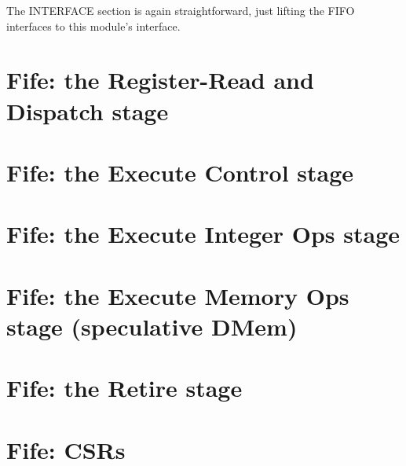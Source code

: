 The INTERFACE section is again straightforward, just lifting the FIFO
interfaces to this module's interface.


\section{Fife: the Register-Read and Dispatch stage}

\label{Sec_Fife_RR_stage}


\section{Fife: the Execute Control stage}

\label{Sec_Fife_Control_stage}


\section{Fife: the Execute Integer Ops stage}

\label{Sec_Fife_IALU_stage}


\section{Fife: the Execute Memory Ops stage (speculative DMem)}

\label{Sec_Fife_DMem_stage}


\section{Fife: the Retire stage}

\label{Sec_Fife_Retire_stage}


\section{Fife: CSRs}

